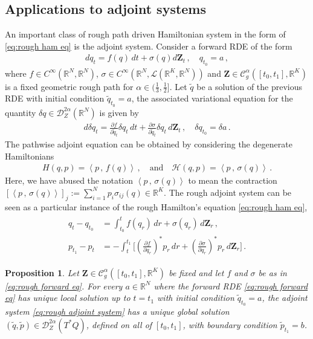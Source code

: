 \documentclass[11pt, oneside]{article}
\numberwithin{equation}{section}
\newtheorem{proposition}[lemma]{Proposition}
\theoremstyle{definition}
\newcommand{\wt}[1]{\widetilde{#1}}
\newcommand{\mc}[1]{\mathcal{#1}}
\newcommand{\mcal}[1]{\mc{#1}}
\newcommand{\scp}[2]{{\left\langle {#1}\, , \, {#2}\right\rangle}}
\def\p{{\partial}}
\def\p{\partial}
\begin{document}
\subsection{Applications to adjoint systems}\label{sec:cts rough adjoints}
An important class of rough path driven Hamiltonian system in the form of \eqref{eq:rough ham eq} is the adjoint system. Consider a forward RDE of the form
\begin{align}
    d q_t = f(q)\, dt + \sigma(q)d\mathbf{Z}_t\,,\quad q_{t_0} = a\,, \label{eq:rough forward eq}
\end{align}
where $f \in C^\infty(\mathbb{R}^N, \mathbb{R}^N)$, $\sigma \in C^\infty(\mathbb{R}^N, \mcal{L}(\mathbb{R}^K, \mathbb{R}^N))$ and $\mathbf{Z} \in \mcal{C}^\alpha_g([t_0, t_1],\mathbb{R}^K)$ is a fixed geometric rough path for $\alpha \in (\frac{1}{3}, \frac{1}{2}]$. Let $\wt{q}$ be a solution of the previous RDE with initial condition $\wt{q}_{t_0} = a$, the associated variational equation for the quantity $\delta q \in \mcal{D}^{2\alpha}_Z(\mathbb{R}^N)$ is given by
\begin{align}\label{eq:rough variational eq}
    d \delta q_t = \frac{\p f}{\p \wt{q}_t}\delta q_t\, dt + \frac{\p \sigma}{\p \wt{q}_t}\delta q_t \,d\mathbf{Z}_t\,,\quad \delta q_{t_0} = \delta a\,.
\end{align}
The pathwise adjoint equation can be obtained by considering the degenerate Hamiltonians
\begin{align}\label{eq:linear ham}
    H(q, p) = \scp{p}{f(q)}\,, \quad \text{and} \quad  \mcal{H}(q,p) = \scp{p}{\sigma(q)}\,.
\end{align}
Here, we have abused the notation $\scp{p}{\sigma(q)}$ to mean the contraction $[\scp{p}{\sigma(q)}]_j := \sum_{i=1}^N p_i \sigma_{ij}(q) \in \mathbb{R}^K$. The rough adjoint system can be seen as a particular instance of the rough Hamilton's equation \eqref{eq:rough ham eq},
\begin{align} \label{eq:rough adjoint system}
\begin{split}
q_t - q_{t_0} &= \int_{t_0}^t f(q_r)\,dr + \sigma(q_r)\, d\mathbf{Z}_r \,, \\
p_{t_1} - p_t &= -\int_t^{t_1} \bigg[\left(\frac{\p f}{\p q_r}\right)^*p_r\,dr + \left(\frac{\p \sigma}{\p q_r}\right)^* p_r\, d\mathbf{Z}_r\bigg]\,.
\end{split}
\end{align}
\begin{proposition}\label{prop:existence solns}
    Let $\mathbf{Z} \in \mcal{C}^\alpha_g([t_0, t_1],\mathbb{R}^K)$ be fixed and let $f$ and $\sigma$ be as in \eqref{eq:rough forward eq}. For every $a \in \mathbb{R}^N$ where the forward RDE \eqref{eq:rough forward eq} has unique local solution up to $t = t_1$ with initial condition $\wt{q}_{t_0} = a$, the adjoint system \eqref{eq:rough adjoint system} has a unique global solution $(\wt{q}, \wt{p}) \in \mcal{D}^{2\alpha}_Z(T^*Q)$, defined on all of $[t_0,t_1]$, with boundary condition $\wt{p}_{t_1} = b$.
\end{proposition}
\end{document}
